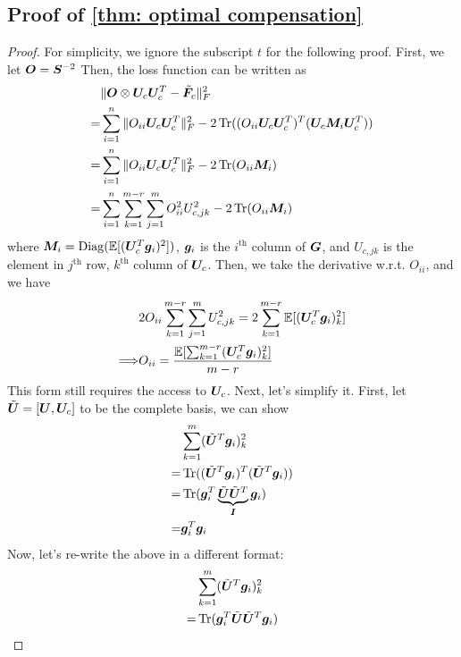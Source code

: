 \subsection{Proof of \cref{thm: optimal compensation}}
\label{subapp: proof optimal compensation}

\begin{proof}
For simplicity, we ignore the subscript $t$ for the following proof.
First, we let ${\bm{O}}={\bm{S}}^{-2}$
    Then, the loss function can be written as 
    \begin{align*}
        &\Vert{\bm{O}}\otimes {\bm{U}}_c{\bm{U}}_c^T-\tilde{\bm{F}}_{c}\Vert_F^2\\
        =& \sum_{i=1}^n \Vert O_{ii} {\bm{U}}_c{\bm{U}}_c^T\Vert_F^2 - 2\operatorname{Tr}((O_{ii}{\bm{U}}_c{\bm{U}}_c^T)^T({\bm{U}}_c{\bm{M}}_i{\bm{U}}_c^T))\\
        =&\sum_{i=1}^n \Vert O_{ii} {\bm{U}}_c{\bm{U}}_c^T\Vert_F^2 - 2\operatorname{Tr}(O_{ii}{\bm{M}}_i)\\
        =& \sum_{i=1}^n\sum_{k=1}^{m-r}\sum_{j=1}^m O_{ii}^2U_{c,jk}^2 - 2\operatorname{Tr}(O_{ii}{\bm{M}}_i)
    \end{align*}
    where ${\bm{M}}_i=\operatorname{Diag}(\mathbb{E}[({\bm{U}}_c^T{\bm{g}}_i)^2])$, ${\bm{g}}_i$ is the $i^{\text{th}}$ column of ${\bm{G}}$, and $U_{c, jk}$ is the element in $j^{\text{th}}$ row, $k^{\text{th}}$ column of ${\bm{U}}_c$. 
    Then, we take the derivative w.r.t. $O_{ii}$, and we have
    \begin{align*}
        &2O_{ii} \sum_{k=1}^{m-r}\sum_{j=1}^m U_{c,jk}^2 = 2\sum_{k=1}^{m-r} \mathbb{E}[({\bm{U}}_c^T{\bm{g}}_i)^2_{k}]\\
        \Longrightarrow& O_{ii} = \frac{\mathbb{E}[\sum_{k=1}^{m-r}({\bm{U}}_c^T{\bm{g}}_i)_k^2]}{m-r}
    \end{align*}
    This form still requires the access to ${\bm{U}}_c$. Next, let's simplify it. 
    First, let $\tilde{{\bm{U}}} = [{\bm{U}}, {\bm{U}}_c]$ to be the complete basis, we can show
    \begin{align*}
        &\sum_{k=1}^m (\tilde{{\bm{U}}}^T{\bm{g}}_i)^2_k \\
        =&\operatorname{Tr}((\tilde{{\bm{U}}}^T{\bm{g}}_i)^T(\tilde{{\bm{U}}}^T{\bm{g}}_i))\\
        =&\operatorname{Tr}({\bm{g}}_i^T\underbrace{\tilde{{\bm{U}}}\tilde{{\bm{U}}}^T}_{{\bm{I}}}{\bm{g}}_i)\\
        =&{\bm{g}}_i^T{\bm{g}}_i\\
    \end{align*}
    Now, let's re-write the above in a different format:
    \begin{align*}
    &\sum_{k=1}^m (\tilde{\mU}^T\vg_i)^2_k \\
        =&\tr(\vg_i^T\tilde{\mU}\tilde{\mU}^T\vg_i)\\

\end{align*}
\end{proof}
